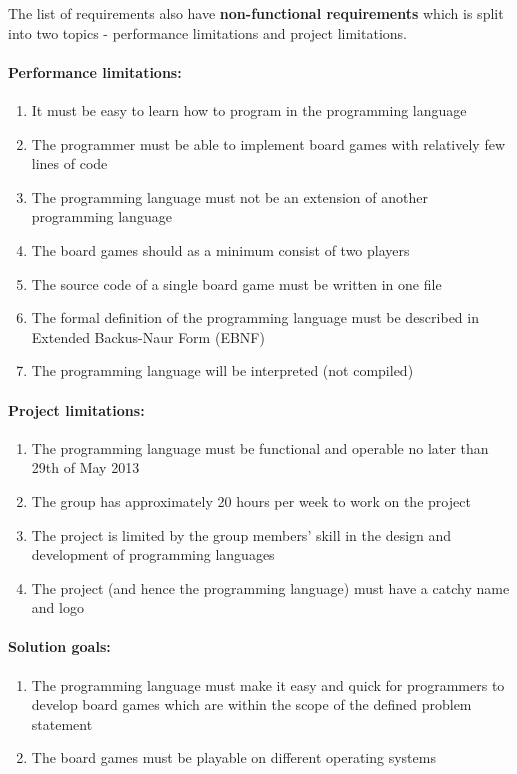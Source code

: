 The list of requirements also have \textbf{non-functional requirements} which is split into two topics - performance limitations and project limitations.

\paragraph*{Performance limitations:}
\begin{enumerate}
  \item It must be easy to learn how to program in the programming language
  \item The programmer must be able to implement board games with relatively few lines of code
  \item The programming language must not be an extension of another programming language
  \item The board games should as a minimum consist of two players
  \item The source code of a single board game must be written in one file
  \item The formal definition of the programming language must be described in Extended Backus-Naur Form (EBNF)
  \item The programming language will be interpreted (not compiled)
\end{enumerate}

\paragraph*{Project limitations:}
\begin{enumerate}
  \item The programming language must be functional and operable no later than 29th of May 2013
  \item The group has approximately 20 hours per week to work on the project
  \item The project is limited by the group members' skill in the design and development of programming languages
  \item The project (and hence the programming language) must have a catchy name and logo
\end{enumerate}

\paragraph*{Solution goals:}
\begin{enumerate}
  \item The programming language must make it easy and quick for programmers to develop board games which are within the scope of the defined problem statement
  \item The board games must be playable on different operating systems
\end{enumerate}


